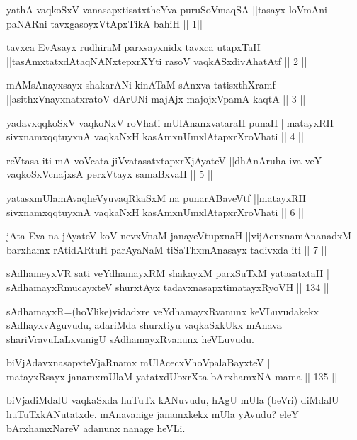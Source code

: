 
\begin{kandikeshl}
yathA vaqkoSxV vanasapxtisatxtheYva puruSoV\s maqSA ||tasayx loVmAni paNARni tavxgasoyxVtApxTikA bahiH || 1||

tavxca EvAsayx rudhiraM parxsayxnidx tavxca utapxTaH ||tasAmxtatxdAtaqNANxtepxrXYti rasoV vaqkASxdivAhatAtf || 2 ||

mAMsAnayxsayx shakarANi kinATaM sAnxva tatisxthXramf ||asithxVnayxnatxratoV dArUNi majAjx majojxVpamA kaqtA || 3 ||

yadavxqqkoSxV vaqkoNxV roVhati mUlAnanxvataraH punaH ||matayxRH sivxnamxqqtuyxnA vaqkaNxH kasAmxnUmxlAtapxrXroVhati || 4 ||

reVtasa iti mA voVcata jiVvatasatxtapxrXjAyateV ||dhAnAruha iva veY vaqkoSxV\s cnajxsA perxVtayx samaBxvaH || 5 ||

yatasxmUlamAvaqheVyuvaqRkaSxM na punarABaveVtf ||matayxRH sivxnamxqqtuyxnA vaqkaNxH kasAmxnUmxlAtapxrXroVhati || 6 ||

jAta Eva na jAyateV koV nevxVnaM janayeVtupxnaH ||vijAcnxnamAnanadxM barxhamx rAtidARtuH parAyaNaM tiSaThxmAnasayx tadivxda iti || 7 ||
\end{kandikeshl}


\begin{shl}
sAdhameyxVR sati veYdhamayxRM shakayxM parxSuTxM yatasatxtaH |\\
sAdhamayxRmucayxteV shurxtAyx tadavxnasapxtimatayxRyoVH \hfill || 134 ||
\end{shl}

\begin{artha}
sAdhamayxR=(hoVlike)vidadxre veYdhamayxRvanunx keVLuvudakekx sAdhayxvAguvudu, adariMda shurxtiyu vaqkaSxkUkx mAnava shariVravuLaLxvanigU sAdhamayxRvanunx heVLuvudu.
\end{artha}


\begin{shl}
biVjAdavxnasapxteVjaRnamx mUlAcecxVhoVpalaBayxteV |\\
matayxRsayx janamxmUlaM yatatxdUbxrXta bArxhamxNA mama \hfill || 135 ||
\end{shl}

\begin{artha}
biVjadiMdalU vaqkaSxda huTuTx kANuvudu, hAgU mUla (beVri) diMdalU huTuTxkANutatxde. mAnavanige janamxkekx mUla yAvudu? eleY bArxhamxNareV adanunx nanage heVLi.
\end{artha}

